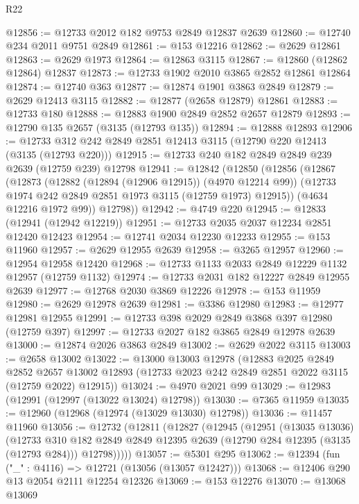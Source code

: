 \begin{lexlean}{R22}
\begin{coremodule}
@12856 := @12733 @2012 @182 @9753 @2849 @12837 @2639
@12860 := @12740 @234 @2011 @9751 @2849
@12861 := @153 @12216
@12862 := @2629 @12861
@12863 := @2629 @1973
@12864 := @12863 @3115
@12867 := @12860 (@12862 @12864) @12837
@12873 := @12733 @1902 @2010 @3865 @2852 @12861 @12864
@12874 := @12740 @363
@12877 := @12874 @1901 @3863 @2849
@12879 := @2629 @12413 @3115
@12882 := @12877 (@2658 @12879) @12861
@12883 := @12733 @180
@12888 := @12883 @1900 @2849 @2852 @2657 @12879
@12893 := @12790 @135 @2657 (@3135 (@12793 @135))
@12894 := @12888 @12893
@12906 := @12733 @312 @242 @2849 @2851 @12413 @3115 (@12790 @220 @12413 (@3135 (@12793 @220)))
@12915 := @12733 @240 @182 @2849 @2849 @239 @2639 (@12759 @239) @12798
@12941 := @12842
    (@12850
      (@12856
        (@12867
          (@12873
            (@12882 (@12894 (@12906 @12915)) (@4970 @12214 @99))
            (@12733 @1974 @242 @2849 @2851 @1973 @3115 (@12759 @1973) @12915))
          (@4634 @12216 @1972 @99))
        @12798))
@12942 := @4749 @220
@12945 := @12833 (@12941 (@12942 @12219))
@12951 := @12733 @2035 @2037 @12234 @2851 @12420 @12423
@12954 := @12741 @2034 @12230 @12233
@12955 := @153 @11960
@12957 := @2629 @12955 @2639
@12958 := @3265 @12957
@12960 := @12954 @12958 @12420
@12968 := @12733 @1133 @2033 @2849 @12229 @1132 @12957 (@12759 @1132)
@12974 := @12733 @2031 @182 @12227 @2849 @12955 @2639
@12977 := @12768 @2030 @3869 @12226
@12978 := @153 @11959
@12980 := @2629 @12978 @2639
@12981 := @3386 @12980
@12983 := @12977 @12981 @12955
@12991 := @12733 @398 @2029 @2849 @3868 @397 @12980 (@12759 @397)
@12997 := @12733 @2027 @182 @3865 @2849 @12978 @2639
@13000 := @12874 @2026 @3863 @2849
@13002 := @2629 @2022 @3115
@13003 := @2658 @13002
@13022 := @13000
    @13003
    @12978
    (@12883
      @2025
      @2849
      @2852
      @2657
      @13002
      @12893
      (@12733 @2023 @242 @2849 @2851 @2022 @3115 (@12759 @2022) @12915))
@13024 := @4970 @2021 @99
@13029 := @12983 (@12991 (@12997 (@13022 @13024) @12798))
@13030 := @7365 @11959
@13035 := @12960 (@12968 (@12974 (@13029 @13030) @12798))
@13036 := @11457 @11960
@13056 := @12732
    (@12811
      (@12827
        (@12945
          (@12951
            (@13035 @13036)
            (@12733
              @310
              @182
              @2849
              @2849
              @12395
              @2639
              (@12790 @284 @12395 (@3135 (@12793 @284)))
              @12798)))))
@13057 := @5301 @295
@13062 := @12394 (fun ("_" : @4116) => @12721 (@13056 (@13057 @12427)))
@13068 := @12406 @290 @13 @2054 @2111 @12254 @12326
@13069 := @153 @12276
@13070 := @13068 @13069

\end{coremodule}
\end{lexlean}

